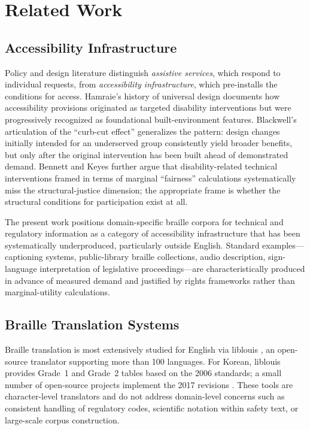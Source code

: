 \documentclass[journal]{IEEEtran}
\begin{document}
\section{Related Work}
\label{sec:related}

\subsection{Accessibility Infrastructure}

Policy and design literature distinguish \emph{assistive services}, which respond to individual requests, from \emph{accessibility infrastructure}, which pre-installs the conditions for access. Hamraie's history of universal design \cite{hamraie} documents how accessibility provisions originated as targeted disability interventions but were progressively recognized as foundational built-environment features. Blackwell's articulation of the ``curb-cut effect'' \cite{curb_cut} generalizes the pattern: design changes initially intended for an underserved group consistently yield broader benefits, but only after the original intervention has been built ahead of demonstrated demand. Bennett and Keyes \cite{bennett_keyes} further argue that disability-related technical interventions framed in terms of marginal ``fairness'' calculations systematically miss the structural-justice dimension; the appropriate frame is whether the structural conditions for participation exist at all.

The present work positions domain-specific braille corpora for technical and regulatory information as a category of accessibility infrastructure that has been systematically underproduced, particularly outside English. Standard examples---captioning systems, public-library braille collections, audio description, sign-language interpretation of legislative proceedings---are characteristically produced in advance of measured demand and justified by rights frameworks rather than marginal-utility calculations.

\subsection{Braille Translation Systems}

Braille translation is most extensively studied for English via liblouis \cite{liblouis}, an open-source translator supporting more than 100 languages. For Korean, liblouis provides Grade~1 and Grade~2 tables based on the 2006 standards; a small number of open-source projects implement the 2017 revisions \cite{hangul_braille_converter,hanbraille}. These tools are character-level translators and do not address domain-level concerns such as consistent handling of regulatory codes, scientific notation within safety text, or large-scale corpus construction.
\end{document}
